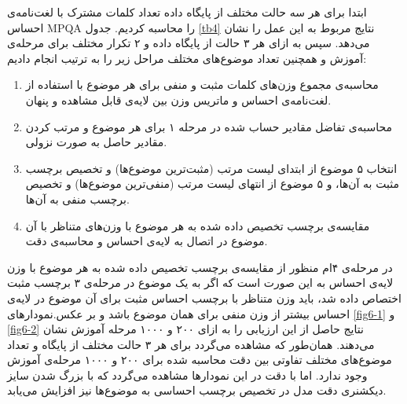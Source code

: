 \documentclass[12pt,a4paper]{article}
\begin{document}
ابتدا برای هر سه‌ حالت مختلف از پایگاه داده تعداد کلمات مشترک با لغت‌نامه‌ی احساس
MPQA
را محاسبه کردیم. جدول
\ref{tb4}
نتایج مربوط به این عمل را نشان می‌‌دهد. سپس به ازای هر ۳ حالت از پایگاه داده و ۲ تکرار مختلف برای مرحله‌ی آموزش و همچنین تعداد موضوع‌های مختلف مراحل زیر را به ترتیب انجام دادیم:
\begin{enumerate}
	\item محاسبه‌ی مجموع وزن‌های کلمات مثبت و منفی‌ برای هر موضوع با استفاده از لغت‌نامه‌ی احساس و ماتریس وزن بین لایه‌ی قابل مشاهده و پنهان.
	\vspace{-0.5cm}
	\item محاسبه‌ی تفاضل مقادیر حساب شده در مرحله ۱ برای هر موضوع و مرتب کردن مقادیر حاصل به صورت نزولی.
	\vspace{-0.5cm}
	\item انتخاب ۵ موضوع از ابتدای لیست مرتب (مثبت‌ترین موضوع‌ها) و تخصیص برچسب مثبت به آن‌ها، و ۵ موضوع از انتهای لیست مرتب (منفی‌ترین موضوع‌ها) و تخصیص برچسب منفی‌ به آن‌ها.
	\vspace{-0.5cm}
	\item مقایسه‌ی برچسب تخصیص داده شده به هر موضوع با وزن‌های متناظر با آن موضوع در اتصال به لایه‌ی
	احساس و محاسبه‌ی دقت.
\end{enumerate}
در مرحله‌ی ۴ام منظور از مقایسه‌ی برچسب تخصیص داده شده به هر موضوع با وزن لایه‌ی
احساس
به این صورت است که اگر به یک موضوع در مرحله‌ی ۳ برچسب مثبت اختصاص داده شد، باید وزن متناظر با برچسب احساس مثبت برای آن موضوع در لایه‌ی احساس بیشتر از وزن منفی‌ برای همان موضوع باشد و بر عکس.نمودار‌های
\ref{fig6-1}
و
\ref{fig6-2}
نتایج حاصل از این ارزیابی را به ازای ۲۰۰ و ۱۰۰۰ مرحله آموزش نشان می‌‌دهند. همان‌طور که مشاهده می‌‌گردد برای هر ۳ حالت مختلف از پایگاه و تعداد موضوع‌های مختلف تفاوتی‌ بین دقت محاسبه شده برای ۲۰۰ و ۱۰۰۰ مرحله‌‌ی آموزش وجود ندارد. اما با دقت در این نمودارها مشاهده می‌‌گردد که با بزرگ شدن سایز دیکشنری دقت مدل در تخصیص برچسب احساسی‌ به موضوع‌ها نیز افزایش می‌‌یابد.
\end{document}
